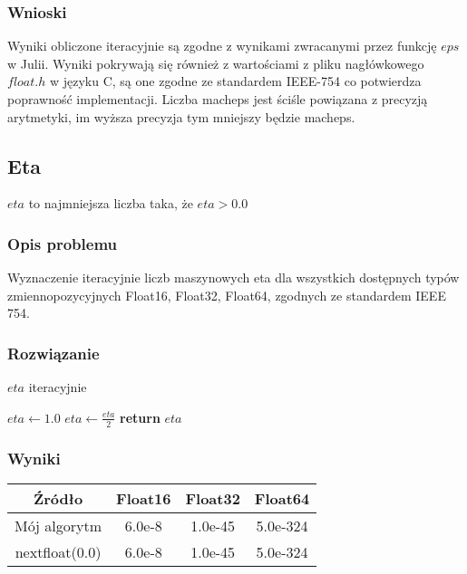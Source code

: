\documentclass{article}
\begin{document}
\subsubsection{Wnioski}
    Wyniki obliczone iteracyjnie są zgodne z wynikami zwracanymi przez funkcję $eps$ w Julii.
    Wyniki pokrywają się również z wartościami z pliku nagłówkowego $float.h$ w języku C, są one zgodne ze standardem IEEE-754 co potwierdza poprawność implementacji.
    Liczba macheps jest ściśle powiązana z precyzją arytmetyki, im wyższa precyzja tym mniejszy będzie macheps.

\subsection{Eta}
	$eta$ to najmniejsza liczba taka, że $eta > 0.0$
\subsubsection{Opis problemu}
    Wyznaczenie iteracyjnie liczb maszynowych eta dla wszystkich dostępnych typów zmiennopozycyjnych Float16, Float32, Float64, zgodnych ze standardem IEEE 754.
\subsubsection{Rozwiązanie}
    \begin{algorithm}
    \caption{$eta$ iteracyjnie}\label{alg:cap}
    \begin{algorithmic}
        \State $eta \gets 1.0$
            \State $eta \gets \frac{eta}{2}$
        \EndWhile
        \State \textbf{return} $eta$
    \end{algorithmic}
    \end{algorithm}
\subsubsection{Wyniki}
    \begin{center}
        \begin{tabular}{|c||c|c|c|}
        \hline
            Źródło & Float16 & Float32 & Float64\\
            \hline\hline
            Mój algorytm & 6.0e-8 & 1.0e-45 & 5.0e-324\\
            \hline
            nextfloat(0.0) & 6.0e-8 & 1.0e-45 & 5.0e-324\\
        \hline
        \end{tabular}
    \end{center}
\end{document}
